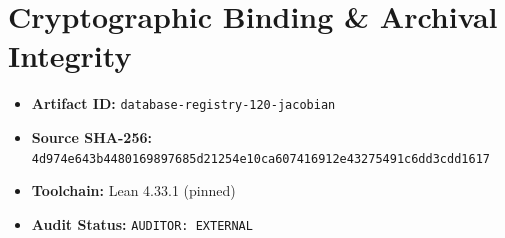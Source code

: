 \documentclass[11pt,a4paper]{article}
\begin{document}
\section{Cryptographic Binding & Archival Integrity}
\begin{itemize}
  \item \textbf{Artifact ID:} \texttt{database-registry-120-jacobian}
  \item \textbf{Source SHA-256:} \texttt{4d974e643b4480169897685d21254e10ca607416912e43275491c6dd3cdd1617}
  \item \textbf{Toolchain:} Lean 4.33.1 (pinned)
  \item \textbf{Audit Status:} \texttt{AUDITOR: EXTERNAL}
\end{itemize}
\end{document}
